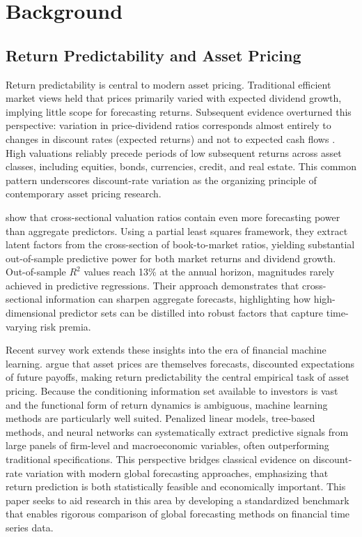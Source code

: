 \documentclass{article}
\begin{document}
\section{Background}
\label{sec:literature}

\subsection{Return Predictability and Asset Pricing}

Return predictability is central to modern asset pricing. Traditional efficient market views held that prices primarily varied with expected dividend growth, implying little scope for forecasting returns. Subsequent evidence overturned this perspective: variation in price-dividend ratios corresponds almost entirely to changes in discount rates (expected returns) and not to expected cash flows \citep{Cochrane2011}. High valuations reliably precede periods of low subsequent returns across asset classes, including equities, bonds, currencies, credit, and real estate. This common pattern underscores discount-rate variation as the organizing principle of contemporary asset pricing research.

\citet{Kelly2013} show that cross-sectional valuation ratios contain even more forecasting power than aggregate predictors. Using a partial least squares framework, they extract latent factors from the cross-section of book-to-market ratios, yielding substantial out-of-sample predictive power for both market returns and dividend growth. Out-of-sample $R^2$ values reach 13\% at the annual horizon, magnitudes rarely achieved in predictive regressions. Their approach demonstrates that cross-sectional information can sharpen aggregate forecasts, highlighting how high-dimensional predictor sets can be distilled into robust factors that capture time-varying risk premia.

Recent survey work extends these insights into the era of financial machine learning. \citet{Kelly2023} argue that asset prices are themselves forecasts, discounted expectations of future payoffs, making return predictability the central empirical task of asset pricing. Because the conditioning information set available to investors is vast and the functional form of return dynamics is ambiguous, machine learning methods are particularly well suited. Penalized linear models, tree-based methods, and neural networks can systematically extract predictive signals from large panels of firm-level and macroeconomic variables, often outperforming traditional specifications. This perspective bridges classical evidence on discount-rate variation with modern global forecasting approaches, emphasizing that return prediction is both statistically feasible and economically important. This paper seeks to aid research in this area by developing a standardized benchmark that enables rigorous comparison of global forecasting methods on financial time series data.
\end{document}
